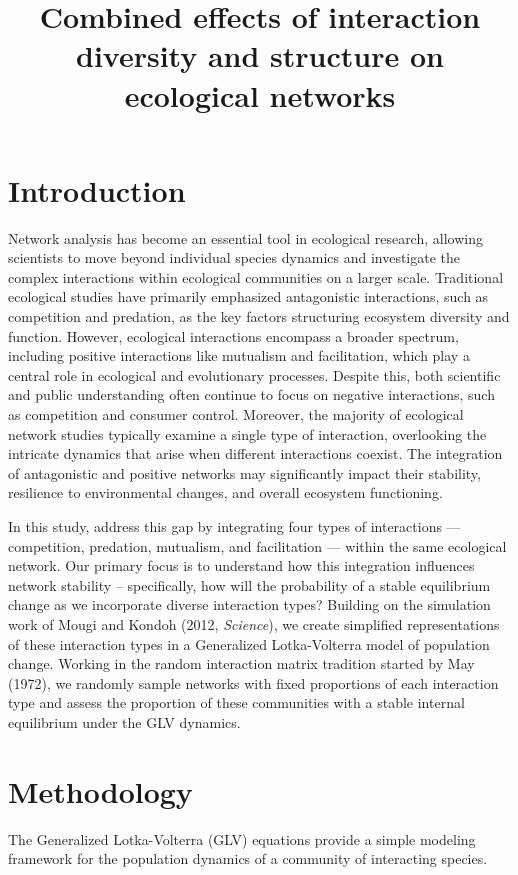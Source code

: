 \documentclass[]{article}
\title{Combined effects of interaction diversity and structure on ecological networks }
\author{}
\date{}  %
\begin{document}
\maketitle

\begin{abstract}
\end{abstract}

\section{Introduction}
Network analysis has become an essential tool in ecological research, allowing scientists to move beyond individual species dynamics and investigate the complex interactions within ecological communities on a larger scale. Traditional ecological studies have primarily emphasized antagonistic interactions, such as competition and predation, as the key factors structuring ecosystem diversity and function. However, ecological interactions encompass a broader spectrum, including positive interactions like mutualism and facilitation, which play a central role in ecological and evolutionary processes. Despite this, both scientific and public understanding often continue to focus on negative interactions, such as competition and consumer control. Moreover, the majority of ecological network studies typically examine a single type of interaction, overlooking the intricate dynamics that arise when different interactions coexist. The integration of antagonistic and positive networks may significantly impact their stability, resilience to environmental changes, and overall ecosystem functioning.

In this study, address this gap by integrating four types of interactions — competition, predation, mutualism, and facilitation — within the same ecological network. Our primary focus is to understand how this integration influences network stability – specifically, how will the probability of a stable equilibrium change as we incorporate diverse interaction types? Building on the simulation work of Mougi and Kondoh (2012, \textit{Science}), we create simplified representations of these interaction types in a Generalized Lotka-Volterra model of population change. Working in the random interaction matrix tradition started by May (1972), we randomly sample networks with fixed proportions of each interaction type and assess the proportion of these communities with a stable internal equilibrium under the GLV dynamics.


\section{Methodology}
The Generalized Lotka-Volterra (GLV) equations provide a simple modeling framework for the population dynamics of a community of interacting species. 
\end{document}
